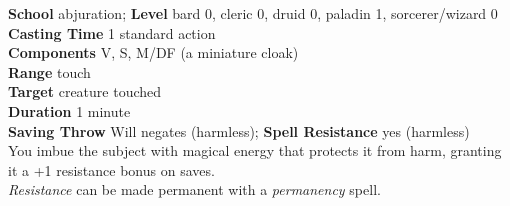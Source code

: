 \textbf{School} abjuration; \textbf{Level} bard 0, cleric 0, druid 0, paladin 1, sorcerer/wizard 0\\
\textbf{Casting Time} 1 standard action\\
\textbf{Components} V, S, M/DF (a miniature cloak)\\
\textbf{Range} touch\\
\textbf{Target} creature touched\\
\textbf{Duration} 1 minute\\
\textbf{Saving Throw }Will negates (harmless); \textbf{Spell Resistance} yes (harmless)\\
You imbue the subject with magical energy that protects it from harm, granting it a +1 resistance bonus on saves.\\
\textit{Resistance }can be made permanent with a \textit{permanency }spell.\\

